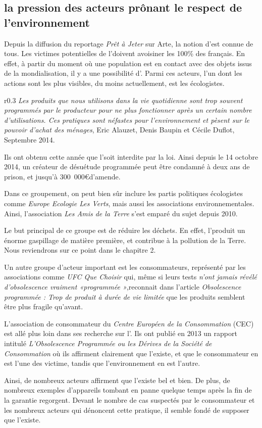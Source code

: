 \subsection{la pression des acteurs prônant le respect de l'environnement }
Depuis la diffusion du reportage \textit{Prêt à Jeter} sur Arte, la notion d'\op est connue de tous. 
Les victimes potentielles de l'\op doivent avoisiner les 100\% des français. En effet, à partir du moment où une population est en contact avec des objets issus de la mondialisation, il y a une possibilité d'\op. 
Parmi ces acteurs, l'un dont les actions sont les plus visibles, du moins actuellement, est les écologistes. 
\begin{wrapfigure}{r}{0.3\textwidth}
\textit{Les produits que nous utilisons dans la vie quotidienne sont trop souvent programmés par le producteur pour ne plus fonctionner après un certain nombre d'utilisations. Ces pratiques sont néfastes pour l'environnement et pèsent sur le pouvoir d'achat des ménages}, Eric Alauzet, Denis Baupin et Cécile Duflot, Septembre 2014.
\end{wrapfigure}
Ils ont obtenu cette année que l'\op soit interdite par la loi. Ainsi depuis le 14 octobre 2014, un créateur de désuétude programmée peut être condamné à deux ans de prison, et jusqu'à 300~000\euro d'amende. 

Dans ce groupement, on peut bien sûr inclure les partis politiques écologistes  comme \textit{Europe Ecologie Les Verts}, mais aussi les associations environnementales. Ainsi, l'association \textit{Les Amis de la Terre} s'est emparé du sujet depuis 2010. 

Le but principal de ce groupe est de réduire les déchets. En effet, l'\op produit un énorme gaspillage de matière première, et contribue à la pollution de la Terre. Nous reviendrons sur ce point dans le chapitre 2.

\medbreak

Un autre groupe d'acteur important est les consommateurs, représenté par les associations comme \textit{UFC Que Choisir} qui, même si leurs tests \textit{n'ont jamais révélé d’obsolescence vraiment «programmée »},reconnait dans l'article \textit{Obsolescence programmée : Trop de produit à durée de vie limitée } que les produits semblent être plus fragile qu'avant. 

L'association de consommateur du \textit{Centre Européen de la Consommation} (CEC) est allé plus loin dans ses recherche sur l'\op. Ils ont publié en 2013 un rapport  intitulé \textit{L'Obsolescence Programmée ou les Dérives de la Société de Consommation} où ils affirment clairement que l'\op existe, et que le consommateur en est l'une des victime, tandis que l'environnement en est l'autre. 

\medbreak

Ainsi, de nombreux acteurs affirment que l'\op existe bel et bien. De plus, de nombreux exemples d'appareils tombant en panne quelque temps après la fin de la garantie regorgent. Devant le nombre de cas suspectés par le consommateur et les nombreux acteurs qui dénoncent cette pratique, il semble fondé de supposer que l'\op existe. 

